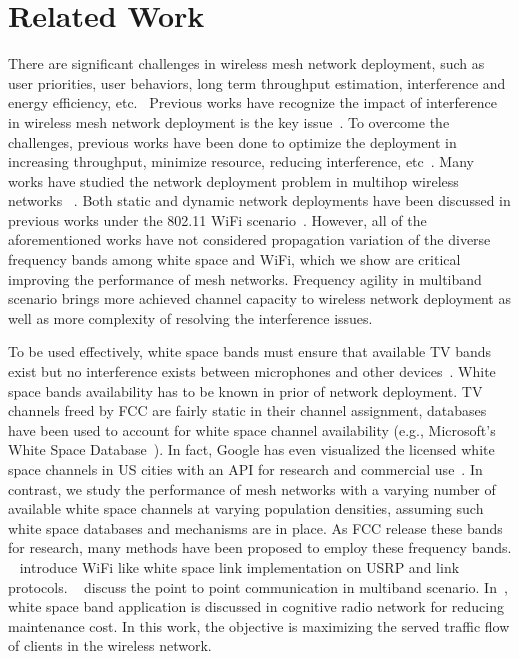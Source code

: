 \section{Related Work}
\label{sec:related}
There are significant challenges in wireless mesh network deployment,
such as user priorities, user behaviors, long term throughput estimation, 
interference and energy efficiency, etc.~\cite{tragos2013spectrum}
Previous works have recognize the impact of interference in wireless mesh network 
deployment is the key issue~\cite{tang2005interference,irwin2013resource,chieochan2013channel}.
To overcome the challenges, previous works have been done to optimize the 
deployment in increasing throughput, minimize resource, reducing interference,
etc~\cite{irwin2013resource,subramanian2008minimum,doraghinejad2014channel}.
Many works have studied the network deployment problem in multihop wireless networks
~\cite{jain2005impact,akyildiz2005wireless,raniwala2004centralized,tragos2013spectrum}.
Both static and dynamic network deployments have been discussed in previous works under
the 802.11 WiFi scenario~\cite{wu2006analysis,ramachandran2006interference,subramanian2008minimum}. 
However, all of the aforementioned works have not considered propagation variation of the 
diverse frequency bands among white space and WiFi, which we show are critical improving 
the performance of mesh networks. Frequency agility in multiband scenario brings more 
achieved channel capacity to wireless network deployment as well as more complexity of 
resolving the interference issues.

To be used effectively, white space bands must ensure that available TV bands
exist but no interference exists between microphones and other devices~\cite{bahl2009white}. 
White space bands availability has to be known in prior of network deployment.
TV channels freed by FCC are fairly static in their channel assignment, 
databases have been used to account for white space channel availability 
(e.g., Microsoft's White Space Database~\cite{msdatabase}).
In fact, Google has even visualized the licensed white space channels 
in US cities with an API for research and commercial use~\cite{googledatabase}.
In contrast, we study the performance of mesh networks with a varying number 
of available white space channels at varying population densities, assuming 
such white space databases and mechanisms are in place. As FCC release these 
bands for research, many methods have been proposed to employ these frequency bands.
~\cite{bahl2009white} introduce WiFi like white space link implementation on USRP and 
link protocols. ~\cite{cui2013leveraging} discuss the point to point communication
in multiband scenario. In~\cite{filippini2013new}, white space band application is 
discussed in cognitive radio network for reducing maintenance cost. 
In this work, the objective is maximizing the served traffic flow of clients in the wireless network.





